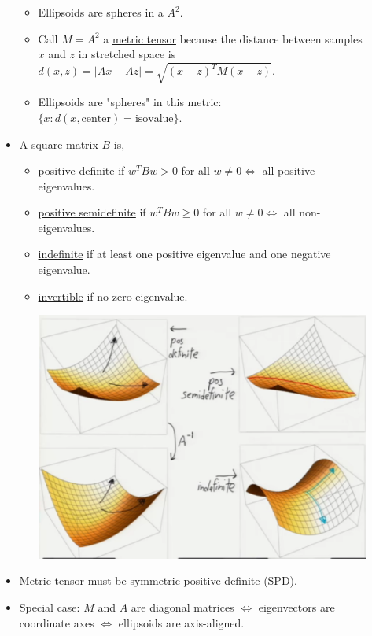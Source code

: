 \documentclass[10pt]{article}
\begin{document}
\begin{description}
\begin{itemize}
				\begin{itemize}
					\item Ellipsoids are spheres in a  $A^{2}$.
					\item Call $M = A^{2}$ a \underline{metric tensor} because the distance between samples $x$ and $z$ in stretched space is $d(x, z) = |Ax - Az| = \sqrt{(x-z)^{T}M(x-z)}$.
					\item Ellipsoids are "spheres" in this metric: $\{x: d(x, \text{center}) = \text{isovalue}\}$.
				\end{itemize}
			\item A square matrix $B$ is,
				\begin{itemize}
					\item \underline{positive definite} if $w^{T}Bw > 0$ for all $w \neq 0 \Leftrightarrow$ all positive eigenvalues.
					\item \underline{positive semidefinite} if $w^{T}Bw \geq 0$ for all $w \neq 0 \Leftrightarrow$ all non-eigenvalues.
					\item \underline{indefinite} if at least one positive eigenvalue and one negative eigenvalue.
					\item \underline{invertible} if no zero eigenvalue.
					\begin{center}
						\includegraphics[scale=0.5]{images/matrices}
					\end{center}
				\end{itemize}
			\item Metric tensor must be symmetric positive definite (SPD).
			\item Special case: $M$ and $A$ are diagonal matrices $\Leftrightarrow$ eigenvectors are coordinate axes $\Leftrightarrow$ ellipsoids are axis-aligned.
		\end{itemize} 
	

\end{description}
\end{document}
